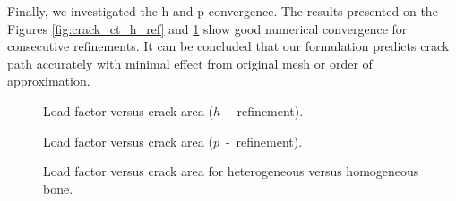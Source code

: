 \documentclass[review]{elsarticle}
\numberwithin{equation}{section}
\begin{document}
Finally, we investigated the h and p convergence. The results presented on the Figures \ref{fig:crack_ct_h_ref} and \ref{fig:crack_ct_p_ref} show good numerical convergence for consecutive refinements. It can be concluded that our formulation predicts crack path accurately with minimal effect from original mesh or order of approximation. 

\begin{figure}
	\centering
	\begin{minipage}{.5\textwidth}
		 \caption{Load factor versus crack area ($h$~-~refinement).}
		 \label{fig:crack_ct_h_ref}
	\end{minipage}%
	\begin{minipage}{.5\textwidth}
		\caption{Load factor versus crack area ($p$~-~refinement).}
		\label{fig:crack_ct_p_ref}
	\end{minipage}
	\end{figure}




\begin{figure}
	\centering
	\caption{Load factor versus crack area for heterogeneous versus homogeneous bone.}
	\label{fig:crack_homo_vs_het}
\end{figure}
\end{document}
